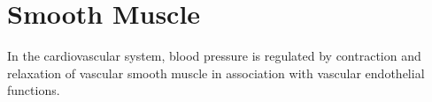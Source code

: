 \chapter{Smooth Muscle}

In the cardiovascular system, blood pressure is regulated by contraction and
relaxation of vascular smooth muscle in association with vascular endothelial
functions.



